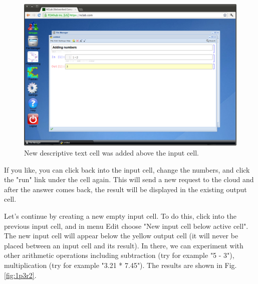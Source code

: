 \documentclass[article,A4,12pt]{llncs}
\begin{document}
\newpage
\begin{figure}[!ht]
\begin{center}
\includegraphics[width=\textwidth]{img/1p3r.png}
\end{center}
\caption{New descriptive text cell was added above the input cell.}
\label{fig:1p3r}
\end{figure}
\noindent
\noindent
If you like, you can click back into the input cell, change 
the numbers, and click the "run" link under the cell again. 
This will send a new request to the cloud and after the answer 
comes back, the result will be displayed in the existing output 
cell. 

Let's continue by creating a new empty input cell. To do this, click
into the previous input cell, and in menu Edit choose "New input cell 
below active cell". The new input cell will appear below the yellow 
output cell (it will never be placed between an input cell and its 
result). In there, we can experiment with other arithmetic operations 
including subtraction (try for example "5 - 3"), multiplication 
(try for example "3.21 * 7.45"). The results are shown in Fig. \ref{fig:1p3r2}.
\end{document}
